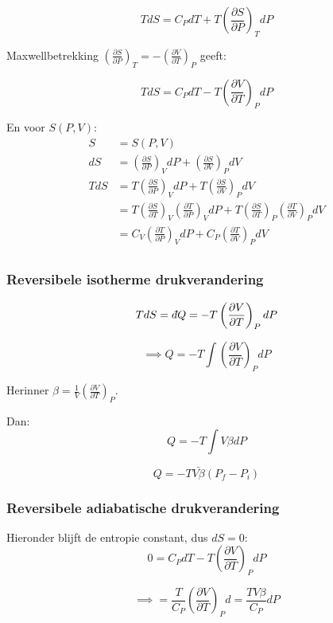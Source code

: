 \[
\boxed{TdS = C_PdT + T\left(\frac{\partial S}{\partial P}\right)_T dP}
\]

Maxwellbetrekking \(\left(\frac{\partial S}{\partial P}\right)_T = -\left(\frac{\partial V}{\partial T}\right)_P\) geeft:

\[\boxed{TdS = C_PdT - T\left(\frac{\partial V}{\partial T}\right)_P dP}\]



En voor \(S(P,V)\):
\begin{align*}
    S &= S(P,V) \\
    dS &= \left(\frac{\partial S}{\partial P}\right)_V dP + \left(\frac{\partial S}{\partial V}\right)_P dV \\
    TdS &= T\left(\frac{\partial S}{\partial P}\right)_V dP + T\left(\frac{\partial S}{\partial V}\right)_P dV \\
    &= T\left(\frac{\partial S}{\partial T}\right)_V\left(\frac{\partial T}{\partial P}\right)_V dP + T\left(\frac{\partial S}{\partial T}\right)_P \left(\frac{\partial T}{\partial V}\right)_P dV \\
    &= C_V\left(\frac{\partial T}{\partial P}\right)_V dP + C_P \left(\frac{\partial T}{\partial V}\right)_P dV \\
\end{align*}

\subsubsection{Reversibele isotherme drukverandering}

\[TdS = \dbar Q= -T \left(\frac{\partial V}{\partial T}\right)_P dP\]

\[\implies Q= -T \int \left(\frac{\partial V}{\partial T}\right)_P dP\]

Herinner \(\beta = \frac{1}{V}\left(\frac{\partial V}{\partial T}\right)_P\).

Dan:
\[Q = -T \int V \beta dP\]

\[Q = -T \bar{V \beta} (P_f - P_i)\]

\subsubsection{Reversibele adiabatische drukverandering}

Hieronder blijft de entropie constant, dus \(dS = 0\):
\[0 = C_P dT - T \left(\frac{\partial V}{\partial T}\right)_P dP\]

\[\implies  = \frac{T}{C_P}\left(\frac{\partial V}{\partial T}\right)_P d = \frac{TV \beta}{C_P}dP\]

